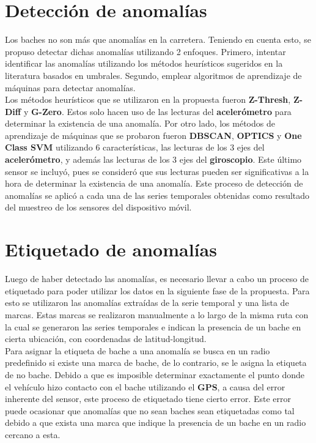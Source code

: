 \section{Detección de anomalías}
	Los baches no son más que anomalías en la carretera. Teniendo en cuenta esto, se propuso detectar dichas anomalías utilizando
	2 enfoques. Primero, intentar identificar las anomalías utilizando los métodos heurísticos sugeridos en la literatura basados
	en umbrales. Segundo, emplear algoritmos de aprendizaje de máquinas para detectar anomalías.\\
	\indent Los métodos heurísticos que se utilizaron en la propuesta fueron \textbf{Z-Thresh}, \textbf{Z-Diff} y \textbf{G-Zero}.
	Estos solo hacen uso de las lecturas del \textbf{acelerómetro} para determinar la existencia de una anomalía. Por otro lado, los
	métodos de aprendizaje de máquinas que se probaron fueron \textbf{DBSCAN}, \textbf{OPTICS} y \textbf{One Class SVM} utilizando 
	6 características, las lecturas de los 3 ejes del \textbf{acelerómetro}, y además las lecturas de los 3 ejes del \textbf{giroscopio}.
	Este último sensor se incluyó, pues se consideró que sus lecturas pueden ser significativas a la hora de determinar la existencia de una 
	anomalía. Este proceso de detección de anomalías se aplicó a cada una de las series temporales obtenidas como resultado del muestreo
	de los sensores del dispositivo móvil.

\section{Etiquetado de anomalías}
	Luego de haber detectado las anomalías, es necesario llevar a cabo un proceso de etiquetado para poder utilizar los datos en la siguiente
	fase de la propuesta. Para esto se utilizaron las anomalías extraídas de la serie temporal y una lista de marcas. Estas marcas se realizaron
	manualmente a lo largo de la misma ruta con la cual se generaron las series temporales e indican la presencia de un bache en cierta
	ubicación, con coordenadas de latitud-longitud.\\
	\indent Para asignar la etiqueta de bache a una anomalía se busca en un radio predefinido si existe una marca de bache, de lo contrario, se le
	asigna la etiqueta de no bache. Debido a que es imposible determinar exactamente el punto donde el vehículo hizo contacto con el bache
	utilizando el \textbf{GPS}, a causa del error inherente del sensor, este proceso de etiquetado tiene cierto error. Este error puede ocasionar
	que anomalías que no sean baches sean etiquetadas como tal debido a que exista una marca que indique la presencia de un bache en un radio
	cercano a esta.

